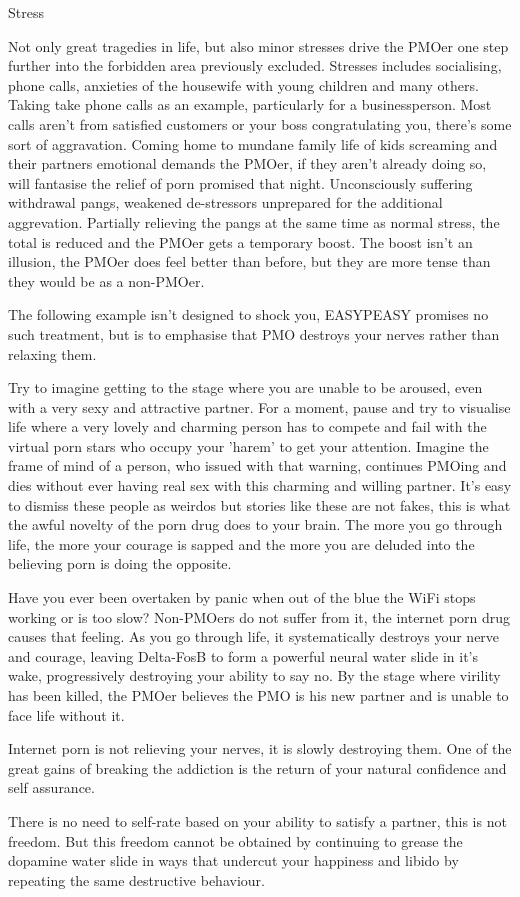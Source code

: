 Stress

Not only great tragedies in life, but also minor stresses drive the PMOer one step further into the forbidden area previously excluded. Stresses includes socialising, phone calls, anxieties of the housewife with young children and many others. Taking take phone calls as an example, particularly for a businessperson. Most calls aren't from satisfied customers or your boss congratulating you, there's some sort of aggravation. Coming home to mundane family life of kids screaming and their partners emotional demands the PMOer, if they aren't already doing so, will fantasise the relief of porn promised that night. Unconsciously suffering withdrawal pangs, weakened de-stressors unprepared for the additional aggrevation. Partially relieving the pangs at the same time as normal stress, the total is reduced and the PMOer gets a temporary boost. The boost isn't an illusion, the PMOer does feel better than before, but they are more tense than they would be as a non-PMOer.

The following example isn't designed to shock you, EASYPEASY promises no such treatment, but is to emphasise that PMO destroys your nerves rather than relaxing them.

Try to imagine getting to the stage where you are unable to be aroused, even with a very sexy and attractive partner. For a moment, pause and try to visualise life where a very lovely and charming person has to compete and fail with the virtual porn stars who occupy your 'harem' to get your attention. Imagine the frame of mind of a person, who issued with that warning, continues PMOing and dies without ever having real sex with this charming and willing partner. It's easy to dismiss these people as weirdos but stories like these are not fakes, this is what the awful novelty of the porn drug does to your brain. The more you go through life, the more your courage is sapped and the more you are deluded into the believing porn is doing the opposite.

Have you ever been overtaken by panic when out of the blue the WiFi stops working or is too slow? Non-PMOers do not suffer from it, the internet porn drug causes that feeling. As you go through life, it systematically destroys your nerve and courage, leaving Delta-FosB to form a powerful neural water slide in it's wake, progressively destroying your ability to say no. By the stage where virility has been killed, the PMOer believes the PMO is his new partner and is unable to face life without it.

Internet porn is not relieving your nerves, it is slowly destroying them. One of the great gains of breaking the addiction is the return of your natural confidence and self assurance.

There is no need to self-rate based on your ability to satisfy a partner, this is not freedom. But this freedom cannot be obtained by continuing to grease the dopamine water slide in ways that undercut your happiness and libido by repeating the same destructive behaviour.
